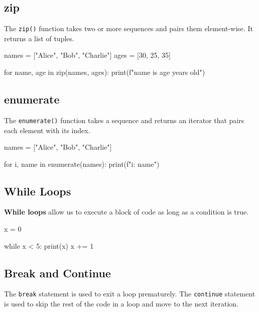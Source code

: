 \subsection*{zip}

The \texttt{zip()} function takes two or more sequences and pairs them element-wise. It returns a list of tuples.

\begin{exampleblock}
\begin{codeblock}[language=python]
names = ["Alice", "Bob", "Charlie"]
ages = [30, 25, 35]

for name, age in zip(names, ages):
    print(f"{name} is {age} years old")
\end{codeblock}
\end{exampleblock}

\subsection*{enumerate}

The \texttt{enumerate()} function takes a sequence and returns an iterator that pairs each element with its index.

\begin{codeblock}[language=python]
names = ["Alice", "Bob", "Charlie"]

for i, name in enumerate(names):
    print(f"{i}: {name}")
\end{codeblock}

\subsection*{While Loops}

\textbf{While loops} allow us to execute a block of code as long as a condition is true.
\begin{exampleblock}
\begin{codeblock}[language=python]
x = 0

while x < 5:
    print(x)
    x += 1
\end{codeblock}
\end{exampleblock}

\subsection*{Break and Continue}

The \texttt{break} statement is used to exit a loop prematurely. The \texttt{continue} statement is used to skip the rest of the code in a loop and move to the next iteration.

